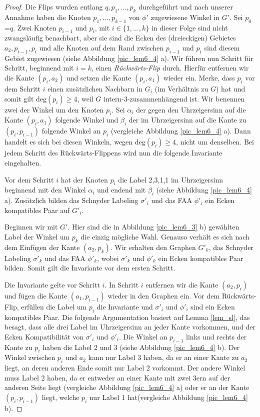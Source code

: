 \begin{proof}
Die Flips wurden entlang $q,p_1,\ldots,p_k$ durchgeführt und nach unserer Annahme haben die Knoten $p_1,\ldots,p_{k-1}$ von $\phi'$ zugewiesene Winkel in $G'$. Sei $p_0$=$q$. Zwei Knoten $p_{i-1}$ und $p_i$, mit $i \in \{1,\ldots,k\}$ in dieser Folge sind nicht zwangsläufig benachbart, aber sie sind die Ecken des (dreieckigen) Gebietes $a_2,p_{i-1},p_{i}$ und alle Knoten auf dem Rand zwischen $p_{i-1}$ und $p_{i}$ sind diesem Gebiet zugewiesen (siehe Abbildung \ref{pic_lem6_4} a). Wir führen nun Schritt für Schritt, beginnend mit $i=k$, einen \textit{Rückwärts-Flip} durch. Hierfür entfernen wir die Kante $(p_{i},a_2)$ und setzen die Kante $(p_{i},a_1)$ wieder ein. Merke, dass $p_{i}$ vor dem Schritt $i$ einen zusätzlichen Nachbarn in $G_{i}$ (im Verhältnis zu $G$) hat und somit gilt $\text{deg}(p_{i}) \geq 4$, weil $G$ intern-3-zusammenhängend ist. Wir benennen zwei der Winkel um den Knoten $p_i$. Sei $\alpha_{i}$ der gegen den Uhrzeigersinn auf die Kante $(p_i,a_1)$ folgende Winkel und $\beta_{i}$ der im Uhrzeigersinn auf die Kante zu $(p_i,p_{i-1})$ folgende Winkel an $p_{i}$ (vergleiche Abbildung \ref{pic_lem6_4} a). Dann handelt es sich bei diesen Winkeln, wegen $\text{deg}(p_i) \geq 4$, nicht um denselben. Bei jedem Schritt des Rückwärts-Flippens wird nun die folgende Invariante eingehalten.

\begin{invariant}
Vor dem Schritt $i$ hat der Knoten $p_i$ die Label 2,3,1,1 im Uhrzeigersinn beginnend mit den Winkel $\alpha_i$ und endend mit $\beta_i$ (siehe Abbildung \ref{pic_lem6_4} a). Zusätzlich bilden das Schnyder Labeling $\sigma'_i$ und das FAA $\phi'_i$ ein Ecken kompatibles Paar auf $G'_i$.
\end{invariant}

Beginnen wir mit $G'$. Hier sind die in Abbildung \ref{pic_lem6_3} b) gewählten Label der Winkel um $p_k$ die einzig mögliche Wahl. Genauso verhält es sich nach dem Einfügen der Kante $(a_2,p_k)$. Wir erhalten den Graphen $G'_{k}$, das Schnyder Labeling $\sigma'_{k}$ und das FAA $\phi'_{k}$, wobei $\sigma'_{k}$ und $\phi'_{k}$ ein Ecken kompatibles Paar bilden. Somit gilt die Invariante vor dem ersten Schritt.

Die Invariante gelte vor Schritt $i$. In Schritt $i$ entfernen wir die Kante $(a_2,p_i)$ und fügen die Kante $(a_1,p_{i-1})$ wieder in den Graphen ein. Vor dem Rückwärts-Flip, erfüllen die Label um $p_i$ die Invariante und $\sigma'_{i}$ und $\phi'_{i}$ sind ein Ecken kompatibles Paar. Die folgende Argumentation basiert auf Lemma \ref{lem_sl}, das besagt, dass alle drei Label im Uhrzeigersinn an jeder Kante vorkommen, und der Ecken Kompatibilität von $\sigma'_{i}$ und $\phi'_{i}$. Die Winkel an $p_{i-1}$ links und rechts der Kante zu $p_i$ haben die Label 2 und 3 (siehe Abbildung \ref{pic_lem6_4} b). Der Winkel zwischen $p_i$ und $a_2$ kann nur Label 3 haben, da er an einer Kante zu $a_2$ liegt, an deren anderen Ende somit nur Label 2 vorkommt. Der andere Winkel muss Label 2 haben, da er entweder an einer Kante mit zwei 3ern auf der anderen Seite liegt (vergleiche Abbildung \ref{pic_lem6_4} a) oder er an der Kante $(p_i,p_{i-1})$ liegt, welche $p_i$ nur Label 1 hat(vergleiche Abbildung \ref{pic_lem6_4} b). 


\end{proof}
